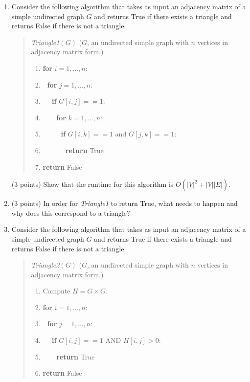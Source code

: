 \documentclass[10pt,letterpaper,unboxed,cm]{article}
\newcommand{\ind}{$~~~$}
\begin{document}
\begin{enumerate}
\begin{enumerate}
\item
Consider the following algorithm that takes as input an adjacency matrix of a simple undirected graph $G$ and returns True if there exists a triangle and returns False if there is not a triangle.

\begin{quote}
\emph{Triangle1}$(G)$ ($G$, an undirected simple graph with $n$ vertices in adjacency matrix form.)
\begin{enumerate}[1.]
\item
{\bf for} $i = 1,\dots, n$:
\item
\ind {\bf for} $j = 1,\dots, n$:
\item
\ind \ind {\bf if} $G[i,j] == 1:$
\item
\ind\ind\ind {\bf for} $k = 1,\dots, n$:
\item
\ind\ind\ind\ind {\bf if} $G[i,k] == 1$ and $G[j,k] == 1$:
\item
\ind\ind\ind\ind\ind {\bf return} True
\item
{\bf return} False
\end{enumerate}
\end{quote}

(3 points)
Show that the runtime for this algorithm is $O(|V|^2 +|V||E|)$.

\item (3 points)
In order for \emph{Triangle1} to return True, what needs to happen and why does this correspond to a triangle?


\item 
Consider the following algorithm that takes as input an adjacency matrix of a simple undirected graph $G$ and returns True if there exists a triangle and returns False if there is not a triangle.

\begin{quote}
\emph{Triangle2}$(G)$ ($G$, an undirected simple graph with $n$ vertices in adjacency matrix form.)
\begin{enumerate}[1.]
\item
Compute $H = G \times G$.
\item
{\bf for} $i = 1,\dots, n$:
\item
\ind {\bf for} $j = 1,\dots,n$:
\item
\ind\ind {\bf if} $G[i,j] == 1$ AND $H[i,j] > 0$:
\item
\ind\ind\ind {\bf return} True
\item
{\bf return} False
\end{enumerate}
\end{quote}


\end{enumerate}
\end{enumerate}
\end{document}
